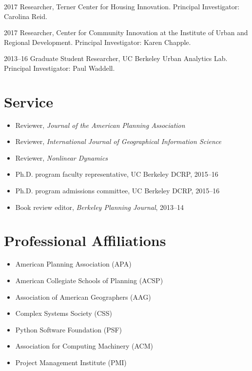 \documentclass{academiccv}
\begin{document}
\begin{tablist}
\item[2017] 	\tab Researcher, Terner Center for Housing Innovation. Principal Investigator: Carolina Reid.
\item[2017] 	\tab Researcher, Center for Community Innovation at the Institute of Urban and Regional Development. Principal Investigator: Karen Chapple.
\item[2013--16] \tab Graduate Student Researcher, UC Berkeley Urban Analytics Lab. Principal Investigator: Paul Waddell.
\end{tablist}



\section*{Service}

\begin{itemize}
\item Reviewer, \emph{Journal of the American Planning Association}
\item Reviewer, \emph{International Journal of Geographical Information Science}
\item Reviewer, \emph{Nonlinear Dynamics}
\item Ph.D. program faculty representative, UC Berkeley DCRP, 2015--16
\item Ph.D. program admissions committee, UC Berkeley DCRP, 2015--16
\item Book review editor, \emph{Berkeley Planning Journal}, 2013--14
\end{itemize}



\section*{Professional Affiliations}

\begin{itemize}
\item American Planning Association (APA)
\item American Collegiate Schools of Planning (ACSP)
\item Association of American Geographers (AAG)
\item Complex Systems Society (CSS)
\item Python Software Foundation (PSF)
\item Association for Computing Machinery (ACM)
\item Project Management Institute (PMI)
\end{itemize}
\end{document}
